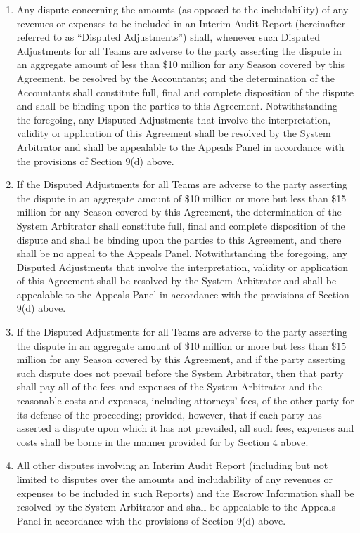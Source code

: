 \documentclass[
]{book}
\begin{document}
\begin{enumerate}
\item
  Any dispute concerning the amounts (as opposed to the includability) of any revenues or expenses to be included in an Interim Audit Report (hereinafter referred to as ``Disputed Adjustments'') shall, whenever such Disputed Adjustments for all Teams are adverse to the party asserting the dispute in an aggregate amount of less than \$10 million for any Season covered by this Agreement, be resolved by the Accountants; and the determination of the Accountants shall constitute full, final and complete disposition of the dispute and shall be binding upon the parties to this Agreement. Notwithstanding the foregoing, any Disputed Adjustments that involve the interpretation, validity or application of this Agreement shall be resolved by the System Arbitrator and shall be appealable to the Appeals Panel in accordance with the provisions of Section 9(d) above.
\item
  If the Disputed Adjustments for all Teams are adverse to the party asserting the dispute in an aggregate amount of \$10 million or more but less than \$15 million for any Season covered by this Agreement, the determination of the System Arbitrator shall constitute full, final and complete disposition of the dispute and shall be binding upon the parties to this Agreement, and there shall be no appeal to the Appeals Panel. Notwithstanding the foregoing, any Disputed Adjustments that involve the interpretation, validity or application of this Agreement shall be resolved by the System Arbitrator and shall be appealable to the Appeals Panel in accordance with the provisions of Section 9(d) above.
\item
  If the Disputed Adjustments for all Teams are adverse to the party asserting the dispute in an aggregate amount of \$10 million or more but less than \$15 million for any Season covered by this Agreement, and if the party asserting such dispute does not prevail before the System Arbitrator, then that party shall pay all of the fees and expenses of the System Arbitrator and the reasonable costs and expenses, including attorneys' fees, of the other party for its defense of the proceeding; provided, however, that if each party has asserted a dispute upon which it has not prevailed, all such fees, expenses and costs shall be borne in the manner provided for by Section 4 above.
\item
  All other disputes involving an Interim Audit Report (including but not limited to disputes over the amounts and includability of any revenues or expenses to be included in such Reports) and the Escrow Information shall be resolved by the System Arbitrator and shall be appealable to the Appeals Panel in accordance with the provisions of Section 9(d) above.
\end{enumerate}
\end{document}
